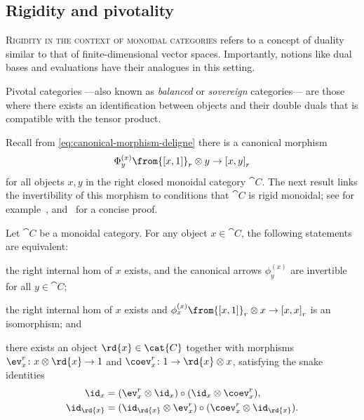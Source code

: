 \subsection{Rigidity and pivotality}\label{subsubsec: rigid_and_piv_cats}

\textsc{Rigidity}
\textsc{in the context of monoidal categories} refers to a concept of duality similar to that of finite\hyp{}dimensional vector spaces.
Importantly, notions like dual bases and evaluations have their analogues in this setting.

Pivotal categories%
—also known as \emph{balanced} or \emph{sovereign} categories—%
are those where there exists an identification between objects and their double duals that is compatible with the tensor product.

Recall from \cref{eq:canonical-morphism-deligne}
there is a canonical morphism
\[
  \Phi^{(x)}_y \from {[x, 1]}_r \otimes y \to {[x, y]}_r
\]
for all objects \(x, y\) in the right closed monoidal category \(\cat{C}\).
The next result links the invertibility of this morphism to conditions that \(\cat{C}\) is rigid monoidal;
see for example~\cite{kelly72:many}, and~\cite[Proposition~2.1]{niefield17:coexp} for a concise proof.

\begin{proposition}\label{prop:dualisable-conditions-Deligne}
  Let \(\cat{C}\) be a monoidal category.
  For any object \(x \in \cat{C}\),
  the following statements are equivalent:
  \begin{thmlist}[itemsep=1ex]
    \item the right internal hom of \(x\) exists, and
    the canonical arrows \(\phi^{(x)}_{y}\) are invertible for all \(y \in\cat{C}\);
    \item the right internal hom of \(x\) exists and \(\phi^{(x)}_x\from {[x, 1]}_r \otimes x \to {[x, x]}_r\) is an isomorphism; and
    \item there exists an object \(\rd{x} \in\cat{C}\) together with morphisms \(\ev^r_x\colon x \otimes \rd{x} \to 1\) and \(\coev^r_x\colon 1 \to \rd{x} \otimes x\), satisfying the snake identities
    \begin{equation}\label{eq:snake-ids}
      \begin{aligned}
        \id_x &= (\ev^r_x \otimes \id_x) \circ (\id_x \otimes \coev^r_x), \\
        \id_{\rd{x}} &= (\id_{\rd{x}} \otimes \ev^r_x) \circ (\coev^r_x \otimes \id_{\rd{x}}).
      \end{aligned}
    \end{equation}
  \end{thmlist}
\end{proposition}

